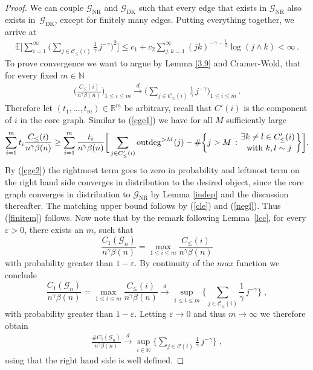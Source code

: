 \documentclass[12pt,a4paper]{article}
\numberwithin{equation}{section}
\begin{document}
\begin{proof}
We can couple $\mathscr G _{\text{NR}}$ and $\mathscr G _{\text{DK}}$ such that every edge that exists in $\mathscr G _{\text{NR}}$ also exists in~$\mathscr G _{\text{DK}}$, except for finitely many edges.
Putting everything together, we arrive at
\begin{align*}
    \mathbb E\bigg[\sum_{i=1}^\infty \Big(\sum_{j\in \mathcal C_{\le}(i)}\frac{1}{\gamma}\, j^{-\gamma}\Big)^2\bigg] \le c_1 + c_2\sum_{j,k=1}^\infty (jk)^{-\gamma-\tfrac12} \log(j \wedge k) <\infty \,.
\end{align*}
To prove convergence we want to argue by Lemma \ref{3.9} and Cramer-Wold, that for every fixed $m\in\mathbb N$
\begin{align}\label{finitem}
   \bigg( \frac{C_{\le}(i)}{n^\gamma \beta(n)}\bigg)_{1\le i \le m} \overset{d}{\longrightarrow} \bigg(\sum_{j\in\mathcal C_{\le}(i)} \frac{1}{\gamma}\, j^{-\gamma}\bigg)_{1\le i \le m} \,.
\end{align}
Therefore let $(t_1,\dots,t_m)\in\mathbb R^m$ be arbitrary, recall that $C'(i)$ is the component of $i$ in the core graph. Similar to (\ref{cge1}) we have for all $M$ sufficiently large
\begin{align*}
 \sum_{i=1}^m t_i \frac{C_{\le}(i)}{n^\gamma \beta(n)} \ge  \sum_{i=1}^m  \frac{t_i}{n^\gamma \beta(n)}\bigg[  \sum_{j\in C_{\le}'(i)} \text{outdeg}^{>M}(j) - \# \bigg\{ j>M\,:{ \exists k\not=l\in C'_{\le}(i)\atop \text{ with } k,l\sim j}\bigg\}\bigg].  
\end{align*}
By (\ref{cge2}) the rightmost term goes to zero in probability and leftmost term on the right hand side converges in distribution to the desired object, since the core graph converges in distribution to $\mathscr G_{\text{NR}}$  by Lemma \ref{indep} and the discussion thereafter. The matching upper bound follows by (\ref{cle}) and (\ref{negl}). Thus (\ref{finitem}) follows.
Now note that by the remark following Lemma~\ref{lcc}, for every $\varepsilon>0$, there exists an $m$, such that
$$ \frac{C_1(\mathscr{G}_n)}{n^\gamma \beta(n)}=\max_{1\le i \le m}\frac{C_{\le}(i)}{n^\gamma \beta(n)}$$
with probability greater than $1-\varepsilon$. By continuity of the $max$ function we conclude 
$$ \frac{C_1(\mathscr{G}_n)}{n^\gamma \beta(n)}=\max_{1\le i \le m}\frac{C_{\le}(i)}{n^\gamma \beta(n)} \overset{d}{\longrightarrow} \sup_{1\le i \le m}\bigg\{\sum_{j\in\mathcal C_{\le}(i)} \frac{1}{\gamma}\, j^{-\gamma}\bigg\}\;,$$
with probability greater than $1-\varepsilon$. Letting $\varepsilon \to 0$ and thus $m\to\infty$ we therefore obtain
\begin{align*}
    \frac{\# C_1(\mathscr{G}_n)}{n^\gamma \beta(n)}  \overset{d}{\longrightarrow} \sup_{i\in\mathbb N}\bigg\{\sum_{j\in\mathcal C(i)} \frac{1}{\gamma}\, j^{-\gamma}\bigg\}\;,
\end{align*}
using that the right hand side is well defined.
\end{proof}
\end{document}
